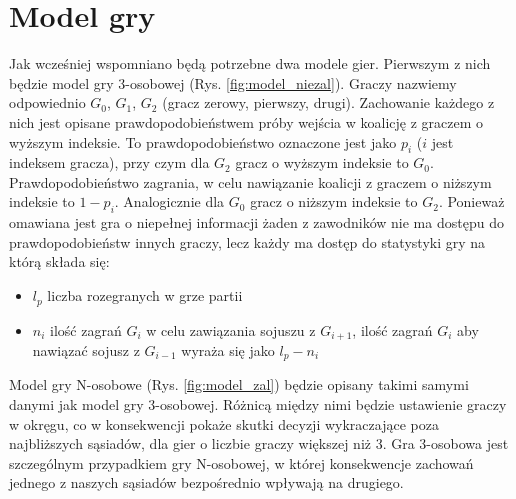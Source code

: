 \section{Model gry}
\label{sec:model}
Jak wcześniej wspomniano będą potrzebne dwa modele gier. Pierwszym z nich będzie model gry 3-osobowej (Rys. \ref{fig:model_niezal}). Graczy nazwiemy odpowiednio $G_0$, $G_1$, $G_2$ (gracz zerowy, pierwszy, drugi). Zachowanie każdego z nich jest opisane prawdopodobieństwem próby wejścia w koalicję z graczem o wyższym indeksie. To prawdopodobieństwo oznaczone jest jako $p_i$ ($i$ jest indeksem gracza), przy czym dla $G_2$ gracz o wyższym indeksie to $G_0$. Prawdopodobieństwo zagrania, w celu nawiązanie koalicji z graczem o niższym indeksie to $1 - p_i$. Analogicznie dla $G_0$ gracz o niższym indeksie to $G_2$. Ponieważ omawiana jest gra o niepełnej informacji żaden z zawodników nie ma dostępu do prawdopodobieństw innych graczy, lecz każdy ma dostęp do statystyki gry na którą składa się:
\begin{itemize}
\item $l_p$ liczba rozegranych w grze partii
\item $n_i$ ilość zagrań $G_i$ w celu zawiązania sojuszu z $G_{i+1}$, ilość zagrań $G_{i}$ aby nawiązać sojusz z $G_{i-1}$ wyraża się jako $l_p - n_i$
\end{itemize}
Model gry N-osobowe (Rys. \ref{fig:model_zal}) \cite{Fsmd} będzie opisany takimi samymi danymi jak model gry 3-osobowej. Różnicą między nimi będzie ustawienie graczy w okręgu, co w konsekwencji pokaże skutki decyzji wykraczające poza najbliższych sąsiadów, dla gier o liczbie graczy większej niż 3. Gra 3-osobowa jest szczególnym przypadkiem gry N-osobowej, w której konsekwencje zachowań jednego z naszych sąsiadów bezpośrednio wpływają na drugiego.

